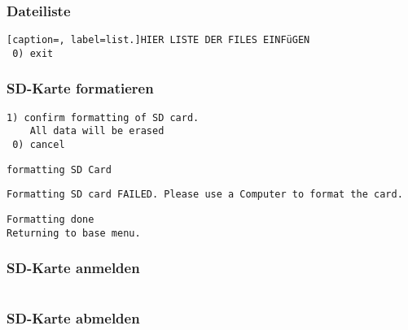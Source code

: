 \subsubsection{Dateiliste}
\begin{lstlisting}[caption=, label=list.]HIER LISTE DER FILES EINFüGEN
 0) exit
\end{lstlisting}


\subsubsection{SD-Karte formatieren}
\begin{lstlisting}[caption=Untermenü SD-Karte formatieren, label=list.sdformat]
 1) confirm formatting of SD card.
    All data will be erased
 0) cancel
\end{lstlisting}

\begin{lstlisting}[caption=Statusmeldung SD formatieren, label=list.sdformatting]
formatting SD Card

\end{lstlisting}

\begin{lstlisting}[caption=Fehlermeldung SD formatieren, label=list.sdformatfail]
Formatting SD card FAILED. Please use a Computer to format the card.
\end{lstlisting}

\begin{lstlisting}[caption=Erfolgsmeldung SD formatieren, label=list.sdformatsuccess]
Formatting done
Returning to base menu.
\end{lstlisting}


\subsubsection{SD-Karte anmelden}
\begin{lstlisting}[caption=Untermenü SD-Karte anmelden, label=list.sdmount]

\end{lstlisting}


\subsubsection{SD-Karte abmelden}
\begin{lstlisting}[caption=Untermenü SD-Karte abmelden, label=list.sdunmount]

\end{lstlisting}


